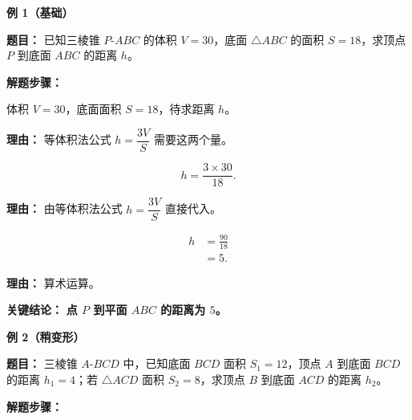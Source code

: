 \textbf{\textcolor{CExample}{例 1（基础）}}

\textbf{\textcolor{CExample}{题目：}} 已知三棱锥 $P\text{-}ABC$ 的体积 $V=30$，底面 $\triangle ABC$ 的面积 $S=18$，求顶点 $P$ 到底面 $ABC$ 的距离 $h$。

\textbf{\textcolor{CExample}{解题步骤：}}

\begin{description}[style=nextline, leftmargin=2.8em, labelsep=0.5em, itemsep=0.45em]
	\item[\textbf{第一步（列条件已知量）：}]
	      体积 $V=30$，底面面积 $S=18$，待求距离 $h$。

	      \par\textbf{理由：}
	      等体积法公式 $h=\dfrac{3V}{S}$ 需要这两个量。

	\item[\textbf{第二步（代入公式）：}]
	      \[
		      h = \frac{3 \times 30}{18}.
	      \]

	      \par\textbf{理由：}
	      由等体积法公式 $h=\dfrac{3V}{S}$ 直接代入。

	\item[\textbf{第三步（计算结果）：}]
	      \[
		      \begin{aligned}
			      h & = \frac{90}{18} \\
			        & = 5.
		      \end{aligned}
	      \]

	      \par\textbf{理由：}
	      算术运算。
\end{description}

\textbf{\textcolor{CExample}{关键结论：}} \textbf{点 $P$ 到平面 $ABC$ 的距离为 $5$。}

\medskip

\textbf{\textcolor{CExample}{例 2（稍变形）}}

\textbf{\textcolor{CExample}{题目：}} 三棱锥 $A\text{-}BCD$ 中，已知底面 $BCD$ 面积 $S_1=12$，顶点 $A$ 到底面 $BCD$ 的距离 $h_1=4$；若 $\triangle ACD$ 面积 $S_2=8$，求顶点 $B$ 到底面 $ACD$ 的距离 $h_2$。

\textbf{\textcolor{CExample}{解题步骤：}}

